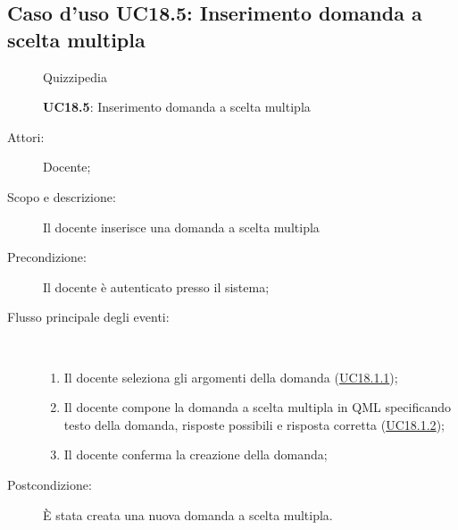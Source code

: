 \subsection{Caso d'uso UC18.5: Inserimento domanda a scelta multipla}
	\begin{figure}[H]
		\centering
		\begin{resizedtikzpicture}{\textwidth}
		\begin{umlsystem}[x=0, fill=lightgray!20]{Quizzipedia}
		\end{umlsystem}
		\end{resizedtikzpicture}
		\caption{\textbf{UC18.5}: Inserimento domanda a scelta multipla}
		\label{UC18.5}
	\end{figure}
\begin{description}
\item[Attori:] Docente;
\item[Scopo e descrizione:] Il docente inserisce una domanda a scelta multipla
      \item[Precondizione:] Il docente è autenticato presso il sistema;

        \item[Flusso principale degli eventi:] \ 
 \begin{enumerate}
          \item Il docente seleziona gli argomenti della domanda (\hyperlink{UC18.1.1}{UC18.1.1});
          \item Il docente compone la domanda a scelta multipla in QML specificando testo della domanda, risposte possibili e risposta corretta (\hyperlink{UC18.1.2}{UC18.1.2});
          \item Il docente conferma la creazione della domanda;

      \end{enumerate}
    \item[Postcondizione:] È stata creata una nuova domanda a scelta multipla.
  \end{description}
\hypertarget{UC18.6}{}
